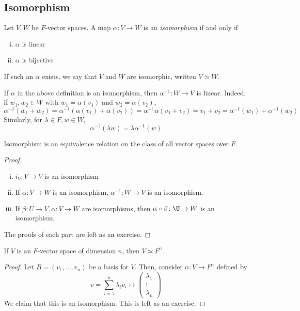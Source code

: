 \subsection{Isomorphism}
\begin{definition}
    Let \( V, W \) be \( F \)-vector spaces.
    A map \( \alpha \colon V \to W \) is an \textit{isomorphism} if and only if
    \begin{enumerate}[(i)]
        \item \( \alpha \) is linear
        \item \( \alpha \) is bijective
    \end{enumerate}
    If such an \( \alpha \) exists, we say that \( V \) and \( W \) are isomorphic, written \( V \simeq W \).
\end{definition}
\begin{remark}
    If \( \alpha \) in the above definition is an isomorphism, then \( \alpha^{-1} \colon W \to V \) is linear.
    Indeed, if \( w_1, w_2 \in W \) with \( w_1 = \alpha(v_1) \) and \( w_2 = \alpha(v_2) \),
    \[ \alpha^{-1} (w_1 + w_2) = \alpha^{-1} (\alpha(v_1) + \alpha(v_2)) = \alpha^{-1} \alpha (v_1 + v_2) = v_1 + v_2 = \alpha^{-1}(w_1) + \alpha^{-1}(w_2) \]
    Similarly, for \( \lambda \in F, w \in W \),
    \[ \alpha^{-1}(\lambda w) = \lambda \alpha^{-1}(w) \]
\end{remark}
\begin{lemma}
    Isomorphism is an equivalence relation on the class of all vector spaces over \( F \).
\end{lemma}
\begin{proof}
    \begin{enumerate}[(i)]
        \item \( i_V \colon V \to V \) is an isomorphism
        \item If \( \alpha \colon V \to W \) is an isomorphism, \( \alpha^{-1} \colon W \to V \) is an isomorphism.
        \item If \( \beta \colon U \to V, \alpha \colon V \to W \) are isomorphisms, then \( \alpha \circ \beta \colon \U \to W \) is an isomorphism.
    \end{enumerate}
    The proofs of each part are left as an exercise.
\end{proof}
\begin{theorem}
    If \( V \) is an \( F \)-vector space of dimension \( n \), then \( V \simeq F^n \).
\end{theorem}
\begin{proof}
    Let \( B = (v_1, \dots, v_n) \) be a basis for \( V \).
    Then, consider \( \alpha \colon V \to F^n \) defined by
    \[ v = \sum_{i=1}^n \lambda_i v_i \mapsto \begin{pmatrix}\lambda_1 \\ \vdots \\ \lambda_n \end{pmatrix} \]
    We claim that this is an isomorphism.
    This is left as an exercise.
\end{proof}
